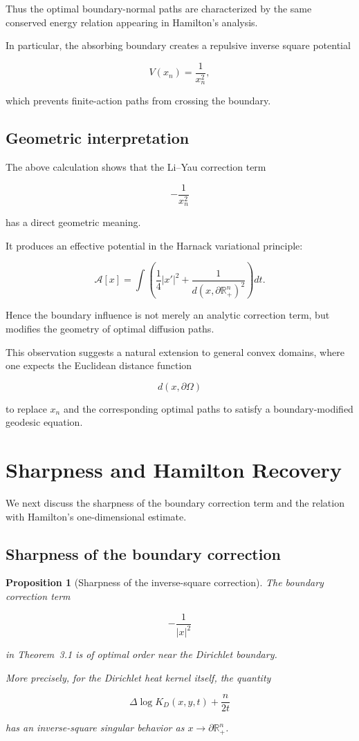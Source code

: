 \documentclass[11pt]{amsart}
\newtheorem{proposition}[theorem]{Proposition}
\theoremstyle{definition}
\theoremstyle{remark}
\begin{document}
Thus the optimal boundary-normal paths are characterized by the
same conserved energy relation appearing in Hamilton's analysis.

In particular, the absorbing boundary creates a repulsive inverse
square potential

\[
V(x_n)=\frac1{x_n^2},
\]

which prevents finite-action paths from crossing the boundary.



\subsection{Geometric interpretation}


The above calculation shows that the Li--Yau correction term

\[
-\frac1{x_n^2}
\]

has a direct geometric meaning.

It produces an effective potential in the Harnack variational
principle:

\[
\mathcal A[x]
=
\int
\left(
\frac14|x'|^2
+
\frac1{
d(x,\partial\mathbb R^n_+)^2
}
\right)dt .
\]


Hence the boundary influence is not merely an analytic correction
term, but modifies the geometry of optimal diffusion paths.

This observation suggests a natural extension to general convex
domains, where one expects the Euclidean distance function

\[
d(x,\partial\Omega)
\]

to replace $x_n$ and the corresponding optimal paths to satisfy a
boundary-modified geodesic equation.


\section{Sharpness and Hamilton Recovery}


We next discuss the sharpness of the boundary correction term and
the relation with Hamilton's one-dimensional estimate.


\subsection{Sharpness of the boundary correction}


\begin{proposition}[Sharpness of the inverse-square correction]

The boundary correction term

\[
-\frac1{|x|^2}
\]

in Theorem~3.1 is of optimal order near the Dirichlet boundary.

More precisely, for the Dirichlet heat kernel itself, the quantity

\[
\Delta \log K_D(x,y,t)
+
\frac n{2t}
\]

has an inverse-square singular behavior as
$x\rightarrow \partial\mathbb R^n_+$.

\end{proposition}
\end{document}
